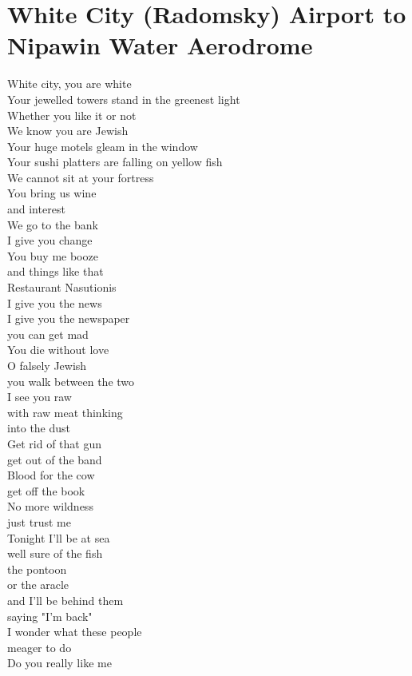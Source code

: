 \documentclass[smalldemyvopaper,11pt,twoside,onecolumn,openright,extrafontsizes]{memoir}
\begin{document}
\chapter{White City (Radomsky) Airport to Nipawin Water Aerodrome}
White city, you are white
\\Your jewelled towers stand in the greenest light
\\Whether you like it or not
\\We know you are Jewish
\\Your huge motels gleam in the window
\\Your sushi platters are falling on yellow fish
\\We cannot sit at your fortress
\\You bring us wine
\\and interest
\\We go to the bank
\\I give you change
\\You buy me booze
\\and things like that
\\Restaurant Nasutionis
\\I give you the news
\\I give you the newspaper
\\you can get mad
\\You die without love
\\O falsely Jewish
\\you walk between the two
\\I see you raw
\\with raw meat thinking
\\into the dust
\\Get rid of that gun
\\get out of the band
\\Blood for the cow
\\get off the book
\\No more wildness
\\just trust me
\\Tonight I'll be at sea
\\well sure of the fish
\\the pontoon
\\or the aracle
\\and I'll be behind them
\\saying "I'm back"
\\I wonder what these people
\\meager to do
\\Do you really like me
\end{document}

